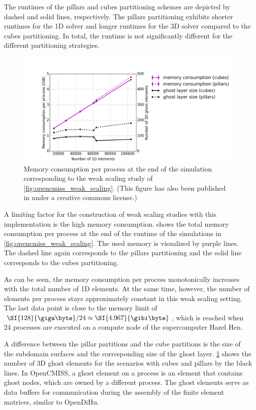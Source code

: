 The runtimes of the pillars and cubes partitioning schemes are depicted by dashed and solid lines, respectively. The pillars partitioning exhibits shorter runtimes for the 1D solver and longer runtimes for the 3D solver compared to the cubes partitioning. In total, the runtime is not significantly different for the different partitioning strategies.

\begin{figure}
  \centering%
  \includegraphics[width=\textwidth]{images/results/studies/opencmiss_memory.png}%
  \caption{Memory consumption per process at the end of the simulation corresponding to the weak scaling study of \cref{fig:opencmiss_weak_scaling}. \footnotesize(This figure has also been published in \cite{Bradley:2018:EDB} under a creative commons license.)}%
  \label{fig:opencmiss_memory}%
\end{figure}%

A limiting factor for the construction of weak scaling studies with this implementation is the high memory consumption.  shows the total memory consumption per process at the end of the runtime of the simulations in \cref{fig:opencmiss_weak_scaling}. The used memory is visualized by purple lines. The dashed line again corresponds to the pillars partitioning and the solid line corresponds to the cubes partitioning. 

As can be seen, the memory consumption per process monotonically increases with the total number of 1D elements. 
At the same time, however, the number of elements per process stays approximately constant in this weak scaling setting. The last data point is close to the memory limit of $\SI{128}{\giga\byte} / 24 \approx \SI{4.967}{\gibi\byte}$, which is reached when 24 processes are executed on a compute node of the supercomputer Hazel Hen.

A difference between the pillar partitions and the cube partitions is the size of the subdomain surfaces and the corresponding size of the ghost layer. \cref{fig:opencmiss_memory} shows the number of 3D ghost elements for the scenarios with cubes and pillars by the black lines. In OpenCMISS, a ghost element on a process is an element that contains ghost nodes, which are owned by a different process. The ghost elements serve as data buffers for communication during the assembly of the finite element matrices, similar to OpenDiHu.

